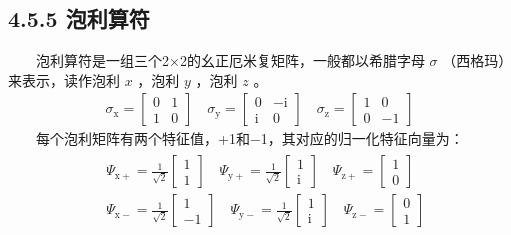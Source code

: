 \documentclass[a4paper,11pt,english]{sphinxmanual}
\begin{document}
\subsection{4.5.5 泡利算符}
\label{\detokenize{rst/4.5QAOA_u7b97_u6cd5:id5}}
\sphinxAtStartPar
  泡利算符是一组三个2×2的幺正厄米复矩阵，一般都以希腊字母  \(\sigma\) （西格玛）来表示，读作泡利  \(x\) ，泡利  \(y\) ，泡利  \(z\) 。
\begin{equation*}
\begin{split}\sigma_{\mathrm{x}}=\left[\begin{array}{ll} 0 & 1 \\ 1 & 0 \end{array}\right] \quad \sigma_{\mathrm{y}}=\left[\begin{array}{cc} 0 & -\mathrm{i} \\ \mathrm{i} & 0 \end{array}\right] \quad \sigma_{\mathrm{z}}=\left[\begin{array}{cc} 1 & 0 \\ 0 & -1 \end{array}\right]\end{split}
\end{equation*}
\sphinxAtStartPar
  每个泡利矩阵有两个特征值，+1和−1，其对应的归一化特征向量为：
\begin{equation*}
\begin{split}\begin{aligned} &\Psi_{\mathrm{x}+}=\frac{1}{\sqrt{2}}\left[\begin{array}{l} 1 \\ 1 \end{array}\right] \quad \Psi_{\mathrm{y}+}=\frac{1}{\sqrt{2}}\left[\begin{array}{l} 1 \\ \mathrm{i} \end{array}\right] \quad \Psi_{\mathrm{z}+}=\left[\begin{array}{l} 1 \\ 0 \end{array}\right] \\ &\Psi_{\mathrm{x}-}=\frac{1}{\sqrt{2}}\left[\begin{array}{c} 1 \\ -1 \end{array}\right] \quad \Psi_{\mathrm{y}-}=\frac{1}{\sqrt{2}}\left[\begin{array}{c} 1 \\ \mathrm{i} \end{array}\right] \quad \Psi_{\mathrm{z}-}=\left[\begin{array}{l} 0 \\ 1 \end{array}\right] \end{aligned}\end{split}
\end{equation*}
\end{document}
